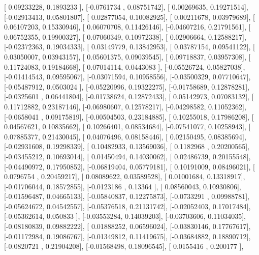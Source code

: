 \documentclass{article}
\begin{document}
       [ 0.09233228,  0.1893233 ],
       [-0.0761734 ,  0.08751742],
       [ 0.00269635,  0.19271514],
       [-0.02913413,  0.05801807],
       [ 0.02877054,  0.10082925],
       [ 0.00211678,  0.03979689],
       [ 0.06107203,  0.15330946],
       [ 0.06070708,  0.11426146],
       [-0.04607216,  0.21791561],
       [ 0.06752355,  0.19900327],
       [ 0.07060349,  0.10972338],
       [ 0.02906664,  0.12588217],
       [-0.02372363,  0.19034333],
       [ 0.03149779,  0.13842953],
       [ 0.03787154,  0.09541122],
       [ 0.03050007,  0.03943157],
       [ 0.05601375,  0.09039545],
       [ 0.09718837,  0.03957308],
       [ 0.11724083,  0.19184668],
       [ 0.07014114,  0.0443083 ],
       [-0.05526724,  0.05827038],
       [-0.01414543,  0.09595067],
       [-0.03071594,  0.10958556],
       [-0.03500329,  0.07710647],
       [-0.05487912,  0.0503024 ],
       [-0.05220996,  0.19322275],
       [-0.01758689,  0.12878281],
       [-0.0325601 ,  0.06441804],
       [-0.01738624,  0.12872433],
       [ 0.05142973,  0.07083132],
       [ 0.11712882,  0.23187146],
       [-0.06980607,  0.12578217],
       [-0.04298582,  0.11052362],
       [-0.0658041 ,  0.09175819],
       [-0.00504503,  0.23184885],
       [ 0.10255018,  0.17986208],
       [ 0.04567621,  0.10835662],
       [ 0.10266401,  0.08534684],
       [-0.07541077,  0.10258943],
       [ 0.07885377,  0.21430045],
       [ 0.04076496,  0.08158446],
       [ 0.02150495,  0.08385694],
       [-0.02931608,  0.19298339],
       [ 0.10482933,  0.13569036],
       [ 0.1182968 ,  0.20200565],
       [-0.03455212,  0.10693014],
       [ 0.01450494,  0.14030062],
       [ 0.02486739,  0.20155548],
       [-0.04490972,  0.17950852],
       [-0.06819404,  0.05779181],
       [ 0.10191009,  0.08496021],
       [ 0.0796754 ,  0.20459217],
       [ 0.08089622,  0.03589528],
       [ 0.01001684,  0.13318917],
       [-0.01706044,  0.18572855],
       [-0.0123186 ,  0.13364   ],
       [ 0.08560043,  0.10930806],
       [-0.01596487,  0.04665133],
       [-0.05840837,  0.12275873],
       [-0.0733291 ,  0.09988781],
       [-0.05624672,  0.04542557],
       [-0.05376518,  0.21131742],
       [-0.02052403,  0.17017484],
       [-0.05362614,  0.050833  ],
       [-0.03553284,  0.14039203],
       [-0.03703606,  0.11034035],
       [-0.08180839,  0.09882222],
       [ 0.01888252,  0.06596024],
       [-0.03830146,  0.17767617],
       [-0.01172984,  0.19086767],
       [-0.01349812,  0.11419675],
       [-0.03684882,  0.18890712],
       [-0.0820721 ,  0.21904208],
       [-0.01568498,  0.18096545],
       [ 0.0155416 ,  0.200177  ],
\end{document}
